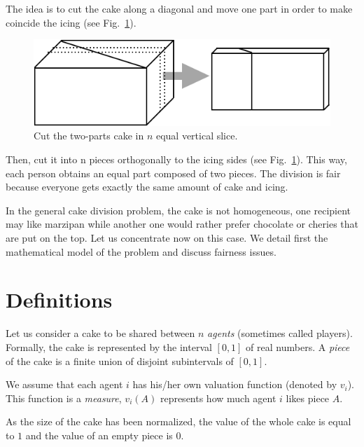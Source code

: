 \begin{itemize}
\begin{figure}[htb]
\end{figure}
The idea is to cut the cake along a diagonal and move one part in order to make coincide the icing
(see Fig.~\ref{Fig:cakeHomogeneous3}).
\begin{figure}[htb]
\begin{center}
        \includegraphics[scale=0.4]{FiguresMaths/CakeHomogeneous3}
        \caption{Cut the two-parts cake in $n$ equal vertical slice.}
        \label{Fig:cakeHomogeneous3}
\end{center}
\end{figure}
Then, cut it into n pieces orthogonally to the icing sides (see Fig.~\ref{Fig:cakeHomogeneous3}). 
This way, each person obtains an equal part composed of two pieces. 
The division is fair because everyone gets exactly the same amount of cake and icing. 
\end{itemize}

In the general cake division problem, the cake is not homogeneous, 
one recipient may like marzipan while another one would rather prefer chocolate or cheries
that are put on the top.
Let us concentrate now on this case.
We detail first the mathematical model of the problem and discuss fairness issues. 

\section{Definitions}

Let us consider a cake to be shared between $n$ \textit{agents} (sometimes called players). 
Formally, the cake is represented by the interval $[0,1]$ of real numbers.
A \textit{piece} of the cake is a finite union of disjoint subintervals of $[0,1]$.

We assume that each agent $i$ has his/her own valuation function (denoted by $v_i$).
This function is a \textit{measure}, $v_i(A)$ represents how much agent $i$ likes piece $A$. 

As the size of the cake has been normalized, the value of the whole cake is equal to $1$
and the value of an empty piece is $0$.

